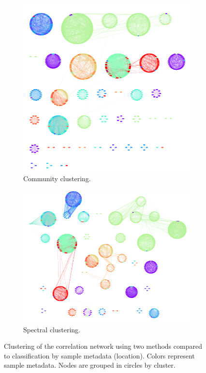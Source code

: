 \documentclass[10pt]{article}
\theoremstyle{definition}
\numberwithin{theorem}{section}
\numberwithin{definition}{section}
\numberwithin{lemma}{section}
\numberwithin{corollary}{section}
\numberwithin{clm}{section}
\numberwithin{rmk}{section}
\begin{document}
\begin{figure}
	\begin{center}
		\begin{subfigure}[b]{0.48\linewidth}
			\begin{center}
				\includegraphics[scale = 0.3]{comm_samp.png}	
			\end{center}
			\caption{Community clustering.}
		\end{subfigure}
		\begin{subfigure}[b]{0.48\linewidth}
			\begin{center}
				\includegraphics[scale = 0.35]{spect_sample.png}	
			\end{center}
			\caption{Spectral clustering.}
		\end{subfigure}
		\caption{Clustering of the correlation network using two methods compared to classification by sample metadata (location). Colors represent sample metadata. Nodes are grouped in circles by cluster.}\label{cluster}
	\end{center}
\end{figure}
\end{document}
